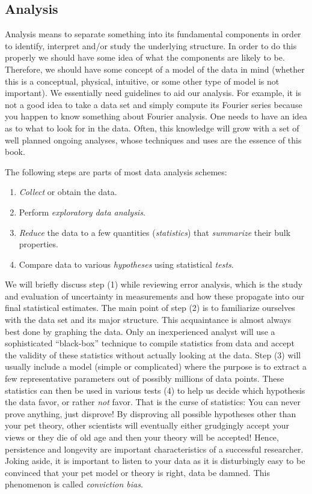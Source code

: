 \subsection{Analysis}

	Analysis means to separate something into its fundamental components in order to identify, interpret and/or study the 
underlying structure.  In order to do this properly we should have some idea of what the 
components are likely to be.  Therefore, we should have some concept of a model of the data in mind 
(whether this is a conceptual, physical, intuitive, or some other type of model is not important).  We 
essentially need guidelines to aid our analysis.  For example, it is not a good idea to take 
a data set and simply compute its Fourier series because you happen to know something about Fourier analysis.  One 
needs to have an idea as to what to look for in the data.  Often, this knowledge will grow with 
a set of well planned ongoing analyses, whose techniques and uses are the essence of this book.

The following steps are parts of most data analysis schemes:
\begin{enumerate}
	\item \emph{Collect} or obtain the data.
	\item Perform \emph{exploratory data analysis}.
	\item \emph{Reduce} the data to a few quantities (\emph{statistics}) that \emph{summarize} their bulk properties.
	\item Compare data to various \emph{hypotheses} using statistical \emph{tests}.
\end{enumerate}
We will briefly discuss step (1) while reviewing error analysis, which is the study and evaluation of 
uncertainty in measurements and how these propagate into our final statistical estimates.  The main point of
step (2) is to familiarize ourselves with the data set and its major structure.  
This acquaintance is almost always best done by graphing the data.  Only an inexperienced analyst will use a 
sophisticated ``black-box'' technique to compile statistics from data and accept the validity of these statistics 
without actually looking at the data.  Step (3) will usually include a model (simple or 
complicated) where the purpose is to extract a few representative parameters out of possibly 
millions of data points.  These statistics can then be used in various tests (4) to help us decide 
which hypothesis the data favor, or rather \emph{not} favor.  That is the curse of statistics: You can never 
prove anything, just disprove!  By disproving all possible hypotheses other than your pet theory, 
other scientists will eventually either grudgingly accept your views or they die of old age and 
then your theory will be accepted!  Hence, persistence and longevity are important characteristics of a successful researcher.
Joking aside, it is important to listen to your data as it is disturbingly easy to be convinced that your pet model
or theory is right, data be damned.  This phenomenon is called \emph{conviction bias}.

